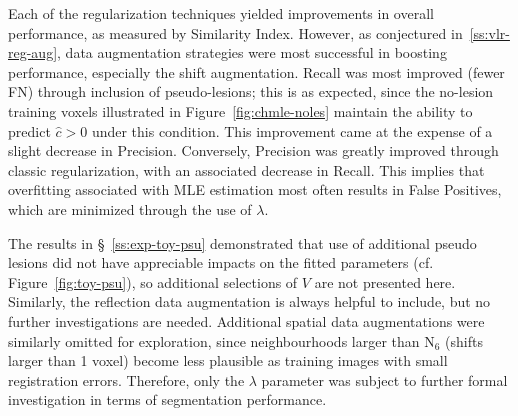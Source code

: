 Each of the regularization techniques yielded
improvements in overall performance, as measured by Similarity Index.
However, as conjectured in~\ref{ss:vlr-reg-aug},
data augmentation strategies were most successful in boosting performance,
especially the shift augmentation.
Recall was most improved (fewer FN) through inclusion of pseudo-lesions; this is as expected,
since the no-lesion training voxels illustrated in Figure~\ref{fig:chmle-noles}
maintain the ability to predict $\hat{c} > 0$ under this condition.
This improvement came at the expense of a slight decrease in Precision.
Conversely, Precision was greatly improved through classic regularization,
with an associated decrease in Recall.
This implies that overfitting associated with MLE estimation
most often results in False Positives,
which are minimized through the use of $\lambda$.
\par
The results in \S~\ref{ss:exp-toy-psu} demonstrated that use of additional
pseudo lesions did not have appreciable impacts on the fitted parameters
(cf. Figure~\ref{fig:toy-psu}), so additional selections of $V$ are not presented here.
Similarly, the reflection data augmentation is always helpful to include,
but no further investigations are needed.
Additional spatial data augmentations were similarly omitted for exploration,
since neighbourhoods larger than $\mathrm{N}_6$ (shifts larger than 1 voxel)
become less plausible as training images with small registration errors.
Therefore, only the $\lambda$ parameter was subject to further formal investigation
in terms of segmentation performance.
